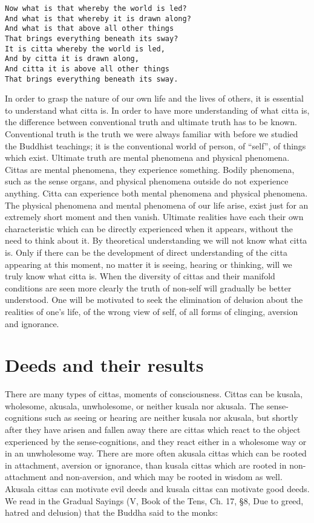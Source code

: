\documentclass{book}
\begin{document}
\begin{verbatim}
Now what is that whereby the world is led?
And what is that whereby it is drawn along?
And what is that above all other things
That brings everything beneath its sway?
It is citta whereby the world is led,
And by citta it is drawn along,
And citta it is above all other things
That brings everything beneath its sway.
\end{verbatim}

In order to grasp the nature of our own life and the lives of others, it
is essential to understand what citta is. In order to have more
understanding of what citta is, the difference between conventional
truth and ultimate truth has to be known. Conventional truth is the
truth we were always familiar with before we studied the Buddhist
teachings; it is the conventional world of person, of ``self'', of
things which exist. Ultimate truth are mental phenomena and physical
phenomena. Cittas are mental phenomena, they experience something.
Bodily phenomena, such as the sense organs, and physical phenomena
outside do not experience anything. Citta can experience both mental
phenomena and physical phenomena. The physical phenomena and mental
phenomena of our life arise, exist just for an extremely short moment
and then vanish. Ultimate realities have each their own characteristic
which can be directly experienced when it appears, without the need to
think about it. By theoretical understanding we will not know what citta
is. Only if there can be the devel­op­ment of direct understanding of
the citta appearing at this moment, no matter it is seeing, hearing or
thinking, will we truly know what citta is. When the diversity of cittas
and their manifold conditions are seen more clearly the truth of
non-self will gradually be better understood. One will be motivated to
seek the elimination of delusion about the realities of one's life, of
the wrong view of self, of all forms of clinging, aversion and
ignorance.

\chapter{Deeds and their results}

There are many types of cittas, moments of consciousness. Cittas can be
kusala, wholesome, akusala, unwholesome, or neither kusala nor akusala.
The sense-cognitions such as seeing or hearing are neither kusala nor
akusala, but shortly after they have arisen and fallen away there are
cittas which react to the object experienced by the sense-cognitions,
and they react either in a wholesome way or in an unwholesome way. There
are more often akusala cittas which can be rooted in attachment,
aversion or ignorance, than kusala cittas which are rooted in
non-attachment and non-aversion, and which may be rooted in wisdom as
well. Akusala cittas can motivate evil deeds and kusala cittas can
motivate good deeds. We read in the Gradual Sayings (V, Book of the
Tens, Ch. 17, §8, Due to greed, hatred and delusion) that the Buddha
said to the monks:
\end{document}
